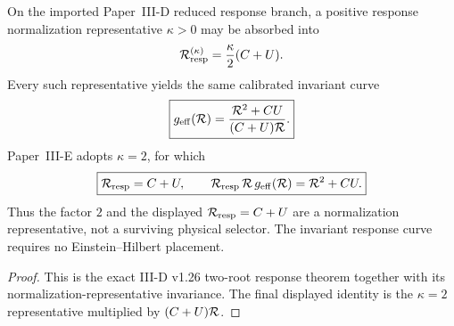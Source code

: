 \documentclass[12pt,a4paper]{article}
\begin{document}
\begin{proposition}
\label{p3:def:reduced-curvature-transport-factor}
On the imported Paper~III-D reduced response branch, a positive response
normalization representative \(\kappa>0\) may be absorbed into
\[
 \mathcal R_{\rm resp}^{(\kappa)}=\frac{\kappa}{2}(C+U).
\]
Every such representative yields the same calibrated invariant curve
\[
 \boxed{g_{\rm eff}(\mathcal R)
 =\frac{\mathcal R^2+CU}{(C+U)\mathcal R}.}
\]
Paper~III-E adopts \(\kappa=2\), for which
\[
 \boxed{\mathcal R_{\rm resp}=C+U,\qquad
        \mathcal R_{\rm resp}\,\mathcal R\,g_{\rm eff}(\mathcal R)=\mathcal R^2+CU.}
\]
Thus the factor \(2\) and the displayed \(\mathcal R_{\rm resp}=C+U\) are a
normalization representative, not a surviving physical selector.  The
invariant response curve requires no Einstein--Hilbert placement.
\end{proposition}

\begin{proof}
This is the exact III-D v1.26 two-root response theorem together with its
normalization-representative invariance.  The final displayed identity is the
\(\kappa=2\) representative multiplied by \((C+U)\mathcal R\).
\end{proof}
\end{document}
